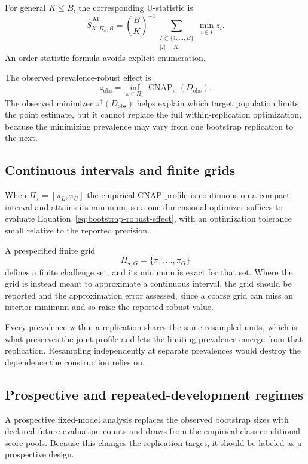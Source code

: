 \documentclass[11pt]{article}
\newcommand{\CNAP}{\operatorname{CNAP}}
\newcommand{\PSet}{\Pi_\star}
\theoremstyle{remark}
\begin{document}
For general $K\leq B$, the corresponding U-statistic is
\begin{equation}
\widehat S_{K,\PSet,B}^{\,\mathrm{AP}}
=
\binom{B}{K}^{-1}
\sum_{\substack{I\subset\{1,\ldots,B\}\\|I|=K}}
\min_{i\in I}z_i.
\label{eq:general-u-statistic}
\end{equation}
An order-statistic formula avoids explicit enumeration.

The observed prevalence-robust effect is
\[
z_{\mathrm{obs}}
=
\inf_{\pi\in\PSet}
\CNAP_\pi(D_{\mathrm{obs}}).
\]
The observed minimizer $\pi^\dagger(D_{\mathrm{obs}})$ helps explain which target population limits the point estimate, but it cannot replace the full within-replication optimization, because the minimizing prevalence may vary from one bootstrap replication to the next.

\subsection{Continuous intervals and finite grids}

When $\PSet=[\pi_L,\pi_U]$ the empirical CNAP profile is continuous on a compact interval and attains its minimum, so a one-dimensional optimizer suffices to evaluate Equation~\eqref{eq:bootstrap-robust-effect}, with an optimization tolerance small relative to the reported precision.

A prespecified finite grid
\[
\Pi_{\star,G}=\{\pi_1,\ldots,\pi_G\}
\]
defines a finite challenge set, and its minimum is exact for that set. Where the grid is instead meant to approximate a continuous interval, the grid should be reported and the approximation error assessed, since a coarse grid can miss an interior minimum and so raise the reported robust value.

Every prevalence within a replication shares the same resampled units, which is what preserves the joint profile and lets the limiting prevalence emerge from that replication. Resampling independently at separate prevalences would destroy the dependence the construction relies on.

\subsection{Prospective and repeated-development regimes}

A prospective fixed-model analysis replaces the observed bootstrap sizes with declared future evaluation counts and draws from the empirical class-conditional score pools. Because this changes the replication target, it should be labeled as a prospective design.
\end{document}
